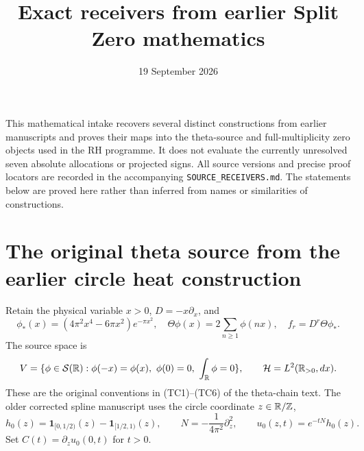 \documentclass[11pt]{article}
\title{Exact receivers from earlier Split Zero mathematics}
\date{19 September 2026}
\begin{document}
\maketitle
This mathematical intake recovers several distinct constructions from
earlier manuscripts and proves their maps into the theta-source and
full-multiplicity zero objects used in the RH programme. It does not evaluate
the currently unresolved seven absolute allocations or projected signs.
All source versions and precise proof locators are recorded in the accompanying
\texttt{SOURCE\_RECEIVERS.md}. The statements below are proved here rather than
inferred from names or similarities of constructions.

\section{The original theta source from the earlier circle heat construction}
Retain the physical variable $x>0$, $D=-x\partial_x$, and
\[
 \phi_*(x)=(4\pi^2x^4-6\pi x^2)e^{-\pi x^2},\quad
 \Theta\phi(x)=2\sum_{n\geq1}\phi(nx),\quad f_r=D^r\Theta\phi_*.
\]
The source space is
\[
 V=\{\phi\in\mathcal S(\mathbb R):\phi(-x)=\phi(x),\ \phi(0)=0,
                  \ \int_\mathbb R\phi=0\},\qquad \mathcal H=L^2(\mathbb R_{>0},dx).
\]
These are the original conventions in (TC1)--(TC6) of the theta-chain text.
The older corrected spline manuscript uses the circle coordinate $z\in\mathbb R/\mathbb Z$,
\[
 h_0(z)=\mathbf1_{[0,1/2)}(z)-\mathbf1_{[1/2,1)}(z),\qquad
 N=-\frac1{4\pi^2}\partial_z^2,\qquad u_0(z,t)=e^{-tN}h_0(z).
\]
Set $C(t)=\partial_z u_0(0,t)$ for $t>0$.
\end{document}
